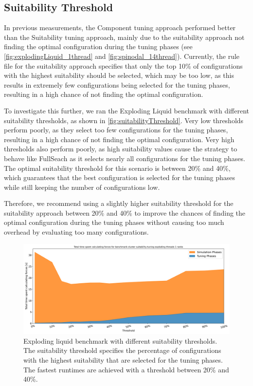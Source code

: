 \subsection{Suitability Threshold}
\label{sec:suitabilityThreshold}

In previous measurements, the Component tuning approach performed better than the Suitability tuning approach, mainly due to the suitability approach not finding the optimal configuration during the tuning phases (see \autoref{fig:explodingLiquid_1thread} and \autoref{fig:spinodal_14thread}).
Currently, the rule file for the suitability approach specifies that only the top 10\% of configurations with the highest suitability should be selected, which may be too low, as this results in extremely few configurations being selected for the tuning phases, resulting in a high chance of not finding the optimal configuration.

To investigate this further, we ran the Exploding Liquid benchmark with different suitability thresholds, as shown in \autoref{fig:suitabilityThreshold}. Very low thresholds perform poorly, as they select too few configurations for the tuning phases, resulting in a high chance of not finding the optimal configuration. Very high thresholds also perform poorly, as high suitability values cause the strategy to behave like FullSeach as it selects nearly all configurations for the tuning phases. The optimal suitability threshold for this scenario is between 20\% and 40\%, which guarantees that the best configuration is selected for the tuning phases while still keeping the number of configurations low.


Therefore, we recommend using a slightly higher suitability threshold for the suitability approach between 20\% and 40\% to improve the chances of finding the optimal configuration during the tuning phases without causing too much overhead by evaluating too many configurations.


\begin{figure}[H]
    \centering
    \includegraphics[width=\columnwidth]{figures/Benchmark/SuitabilitySearch/SuitabilityExploding_timings_threshold_benchmark-cluster_suitability-tuning-exploding_1.png}
    \caption[Exploding liquid benchmark with different suitability thresholds]{Exploding liquid benchmark with different suitability thresholds. The suitability threshold specifies the percentage of configurations with the highest suitability that are selected for the tuning phases. The fastest runtimes are achieved with a threshold between 20\% and 40\%.}
    \label{fig:suitabilityThreshold}
\end{figure}